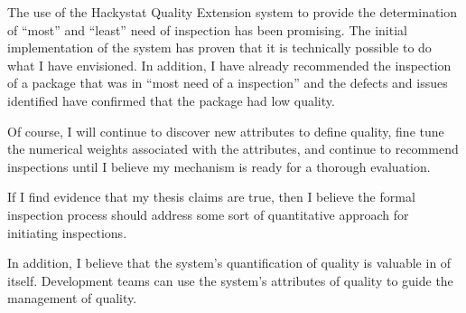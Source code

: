 \documentclass[11pt,twocolumn]{article}
\begin{document}
The use of the Hackystat Quality Extension system to provide the
determination of ``most'' and ``least'' need of inspection has been promising.
The initial implementation of the system has proven that it is technically
possible to do what I have envisioned. In addition, I have already
recommended the inspection of a package that was in ``most need of a inspection''
and the defects and issues identified have confirmed that the package had
low quality.

Of course, I will continue to discover new attributes to define quality,
fine tune the numerical weights associated with the attributes, and
continue to recommend inspections until I believe my mechanism is ready for a
thorough evaluation.

If I find evidence that my thesis claims are true, then I believe the
formal inspection process should address some sort of quantitative approach
for initiating inspections.

In addition, I believe that the system's quantification of quality is
valuable in of itself. Development teams can use the system's attributes of
quality to guide the management of quality.




\end{document}
